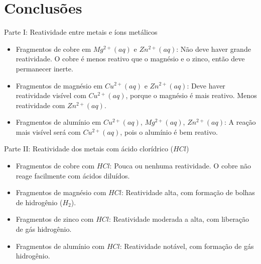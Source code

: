 
\chapter{Conclusões}
Parte I: Reatividade entre metais e íons metálicos
\begin{itemize}
 \item Fragmentos de cobre em $Mg^{2+}{(aq)}$ e $Zn^{2+}{(aq)}$: Não deve haver grande reatividade. O cobre é menos reativo que o magnésio e o zinco, então deve permanecer inerte.
 \item Fragmentos de magnésio em $Cu^{2+}{(aq)}$ e $Zn^{2+}{(aq)}$: Deve haver reatividade visível com $Cu^{2+}{(aq)}$, porque o magnésio é mais reativo. Menos reatividade com $Zn^{2+}{(aq)}$.
 \item Fragmentos de alumínio em $Cu^{2+}{(aq)}$, $Mg^{2+}{(aq)}$, $Zn^{2+}{(aq)}$: A reação mais visível será com $Cu^{2+}{(aq)}$, pois o alumínio é bem reativo.
\end{itemize}


Parte II: Reatividade dos metais com ácido clorídrico ($HCl$)
\begin{itemize}
 \item Fragmentos de cobre com $HCl$: Pouca ou nenhuma reatividade. O cobre não reage facilmente com ácidos diluídos.
 \item Fragmentos de magnésio com $HCl$: Reatividade alta, com formação de bolhas de hidrogênio ($H_2$).
 \item Fragmentos de zinco com $HCl$: Reatividade moderada a alta, com liberação de gás hidrogênio.
 \item Fragmentos de alumínio com $HCl$: Reatividade notável, com formação de gás hidrogênio.
\end{itemize}

